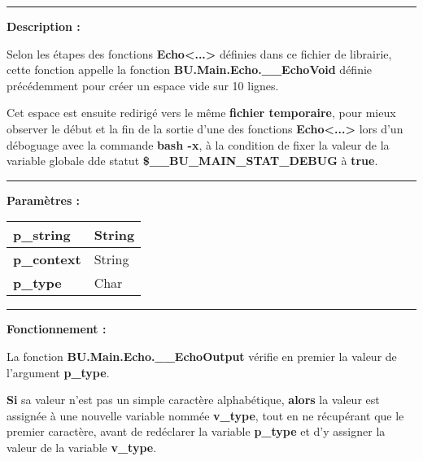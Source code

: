 \documentclass[a4paper,10pt]{article}
\begin{document}

\par\noindent\rule{\textwidth}{0.4pt}

\begin{justify}
    \textbf{Description :}

    Selon les étapes des fonctions \textbf{\color{func}Echo<...>} définies dans ce fichier de librairie, cette fonction appelle la fonction \textbf{\color{func}BU.Main.Echo.\_\_EchoVoid} définie précédemment pour créer un espace vide sur 10 lignes.

    Cet espace est ensuite redirigé vers le même \textbf{\color{path}fichier temporaire}, pour mieux observer le début et la fin de la sortie d'une des fonctions \textbf{\color{func}Echo<...>} lors d'un déboguage avec la commande \textbf{\color{cmds}bash -x}, à la condition de fixer la valeur de la variable globale dde statut \textbf{\color{vars}\$\_\_BU\_MAIN\_STAT\_DEBUG} à \textbf{true}.
\end{justify}


\par\noindent\rule{\textwidth}{0.4pt}

\begin{justify}
    \textbf{Paramètres :}

    \begin{tabular}{|l|l|}
        \hline
        \textbf{\color{vars}p\_string} & String\\
        \hline
        \textbf{\color{vars}p\_context} & String\\
        \hline
        \textbf{\color{vars}p\_type} & Char\\
        \hline
    \end{tabular}
\end{justify}

\setlength{\parskip}{2em}


\par\noindent\rule{\textwidth}{0.4pt}\setlength{\parskip}{1em}

\begin{justify}
    \textbf{Fonctionnement :}

    La fonction \textbf{\color{func}BU.Main.Echo.\_\_EchoOutput} vérifie en premier la valeur de l'argument \textbf{\color{vars}p\_type}.
\end{justify}

\begin{justify}
    \textbf{\color{cond}Si} sa valeur n'est pas un simple caractère alphabétique, \textbf{\color{cond}alors} la valeur est assignée à une nouvelle variable nommée \textbf{\color{vars}v\_type}, tout en ne récupérant que le premier caractère, avant de redéclarer la variable \textbf{\color{vars}p\_type} et d'y assigner la valeur de la variable \textbf{\color{vars}v\_type}.
\end{justify}
\end{document}
